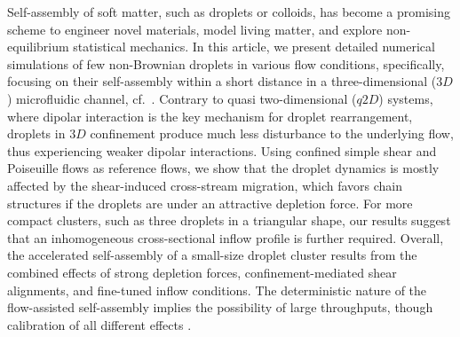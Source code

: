 \begin{paper}

\makepapertitle

%
\begin{paperabstract}
Self-assembly of soft matter, such as droplets or colloids, has become a promising scheme to engineer novel materials, model living matter, and explore non-equilibrium statistical mechanics. In this article, we present detailed numerical simulations of few non-Brownian droplets in various flow conditions, specifically, focusing on their self-assembly within a short distance in a three-dimensional ($3D$) microfluidic channel, cf.\
\cite{tabeling}.
Contrary to quasi two-dimensional ($q2D$) systems, where dipolar interaction is the key mechanism for droplet rearrangement, droplets in $3D$ confinement produce much less disturbance to the underlying flow, thus experiencing weaker dipolar interactions. Using confined simple shear and Poiseuille flows as reference flows, we show that the droplet dynamics is mostly affected by the shear-induced cross-stream migration, which favors chain structures if the droplets are under an attractive depletion force. For more compact clusters, such as three droplets in a triangular shape, our results suggest that an inhomogeneous cross-sectional inflow profile is further required. Overall, the accelerated self-assembly of a small-size droplet cluster results from the combined effects of strong depletion forces, confinement-mediated shear alignments, and fine-tuned inflow conditions. The deterministic nature of the flow-assisted self-assembly implies the possibility of large throughputs, though calibration of all different effects .
\end{paperabstract}


%



%
\clearpage


%

\end{paper}
